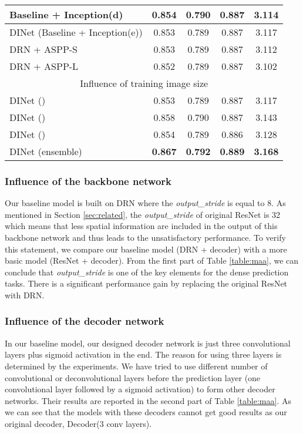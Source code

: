 \begin{table}[]
\begin{tabular}{|l|cccc|}
		Baseline + Inception(d)             & 0.854	&0.790	&0.887	&3.114 \\ \hline
		DINet (Baseline + Inception(e))  & 0.853  & 0.789 & 0.887 & 3.117 \\ \hline
		DRN + ASPP-S             & 0.853&	0.789&	0.887	&3.112 \\ \hline		
		DRN + ASPP-L            & 0.852&	0.789	&0.887	&3.102 \\ \hline \hline			
		\multicolumn{5}{|c|}{Influence of training image size}               \\ \hline
		DINet ()                      & 0.853  & 0.789 & 0.887 & 3.117 \\ \hline
		DINet ()                      & 0.858  & 0.790  & 0.887 & 3.143 \\ \hline
		DINet ()                      & 0.854  & 0.789 & 0.886 & 3.128 \\ \hline
		DINet    (ensemble)                  & \textbf{0.867}  & \textbf{0.792}  & \textbf{0.889} & \textbf{3.168} \\ \hline
	\end{tabular}
\vspace{-4mm}
\end{table}

\subsubsection{Influence of the backbone network} 
Our baseline model is built on DRN where the \emph{output\_stride} is equal to 8. As mentioned in Section \ref{sec:related}, the \emph{output\_stride} of original ResNet is 32 which means that less spatial information are included in the output of this backbone network and thus leads to the unsatisfactory performance. To verify this statement, we compare our baseline model (DRN + decoder) with a more basic model (ResNet + decoder). From the first part of Table \ref{table:maa}, we can conclude that \emph{output\_stride} is one of the key elements for the dense prediction tasks. There is a significant performance gain by replacing the original ResNet with DRN. 


\subsubsection{Influence of the decoder network} 
\label{sec:dec}
In our baseline model, our designed decoder network is just three convolutional layers plus sigmoid activation in the end. The reason for using three layers is determined by the experiments. We have tried to use different number of convolutional or deconvolutional layers before the prediction layer (one convolutional layer followed by a sigmoid activation) to form other decoder networks. Their results are reported in the second part of Table \ref{table:maa}. As we can see that the models with these decoders cannot get good results as our original decoder, \ie Decoder(3 conv layers).




